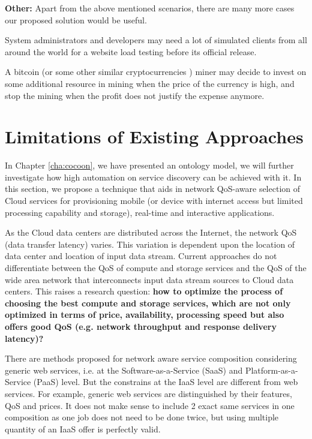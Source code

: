 \textbf{Other:} Apart from the above mentioned scenarios, there are many more cases our proposed solution would be useful.

System administrators and developers may need a lot of simulated clients from all around the world for a website load testing before its official release.

A bitcoin    \cite{bedford2013bitcoin} (or some other similar cryptocurrencies \cite{ref17}) miner may decide to invest on some additional resource in mining when the price of the currency is high, and stop the mining when the profit does not justify the expense anymore.

\section{Limitations of Existing Approaches}
In Chapter \ref{cha:cocoon}, we have presented an ontology model, we will further investigate
how high automation on service discovery can be achieved with it.
In this section, we propose a technique that aids in network QoS-aware selection of Cloud services for provisioning mobile (or device with internet access but limited processing capability and storage), real-time and interactive applications.

As the Cloud data centers are distributed across the Internet, the network QoS (data transfer latency) varies. This variation is dependent upon the location of data center and location of input data stream. Current approaches do not differentiate between the QoS of compute and storage services and the QoS of the wide area network that interconnects input data stream sources to Cloud data centers. This raises a research question: \textbf{how to optimize the process of choosing the best compute and storage services, which are not only optimized in terms of price, availability, processing speed but also offers good QoS (e.g. network throughput and response delivery latency)?}

There are methods proposed for network aware service composition \cite{yu2007efficient}   \cite{zeng2004qos} \cite{zheng2013qos} considering generic web services, i.e. at the Software-as-a-Service (SaaS) and Platform-as-a-Service (PaaS) level. But the constrains at the IaaS level are different from web services. For example, generic web services are distinguished by their features, QoS and prices. It does not make sense to include 2 exact same services in one composition as one job does not need to be done twice, but using multiple quantity of an IaaS offer is perfectly valid.

